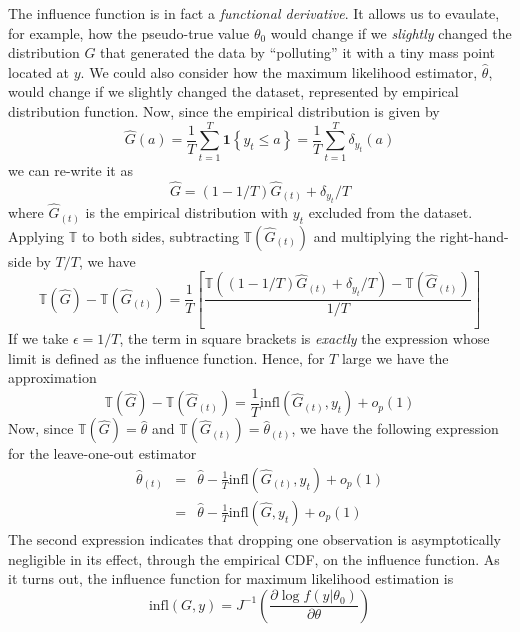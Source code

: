 The influence function is in fact a \emph{functional derivative}. 
It allows us to evaulate, for example, how the pseudo-true value $\theta_0$  would change if we \emph{slightly} changed the distribution $G$ that generated the data by ``polluting'' it with a tiny mass point located at $y$. 
We could also consider how the maximum likelihood estimator, $\widehat{\theta}$, would change if we slightly changed the dataset, represented by empirical distribution function. 
Now, since the empirical distribution is given by
$$\widehat{G}(a) = \frac{1}{T}\sum_{t=1}^T \textbf{1}\left\{y_t \leq a\right\} = \frac{1}{T}\sum_{t=1}^T \delta_{y_t}(a)$$
we can re-write it as 
$$\widehat{G} = (1 - 1/T) \widehat{G}_{(t)} + \delta_{y_t}/T$$
where $\widehat{G}_{(t)}$ is the empirical distribution with $y_t$ excluded from the dataset. Applying $\mathbb{T}$ to both sides, subtracting $\mathbb{T}(\widehat{G}_{(t)})$ and multiplying the right-hand-side by $T/T$, we have
	$$\mathbb{T}(\widehat{G}) - \mathbb{T}(\widehat{G}_{(t)}) = \frac{1}{T}\left[\frac{\mathbb{T}\left((1 - 1/T) \widehat{G}_{(t)} + \delta_{y_t}/T \right) - \mathbb{T}(\widehat{G}_{(t)})}{1/T} \right]$$
If we take $\epsilon = 1/T$, the term in square brackets is \emph{exactly} the expression whose limit is defined as the influence function. 
Hence, for $T$ large we have the approximation
$$\mathbb{T}(\widehat{G}) - \mathbb{T}(\widehat{G}_{(t)}) = \frac{1}{T} \mbox{infl}\left(\widehat{G}_{(t)}, y_t \right) + o_p(1)$$
Now, since $\mathbb{T}(\widehat{G}) = \widehat{\theta}$ and $\mathbb{T}(\widehat{G}_{(t)}) =\widehat{\theta}_{(t)}$, we have the following expression for the leave-one-out estimator
\begin{eqnarray*}
	\widehat{\theta}_{(t)} &=& \widehat{\theta} - \frac{1}{T} \mbox{infl}\left(\widehat{G}_{(t)}, y_t\right) + o_p(1)\\
	&=& \widehat{\theta} - \frac{1}{T} \mbox{infl}\left(\widehat{G}, y_t\right) + o_p(1)
\end{eqnarray*}
The second expression indicates that dropping one observation is asymptotically negligible in its effect, through the empirical CDF, on the influence function.
As it turns out, the influence function for maximum likelihood estimation is
	$$\mbox{infl}(G,y) = J^{-1} \left(\frac{\partial \log f(y|\theta_0)}{\partial \theta}\right)$$
